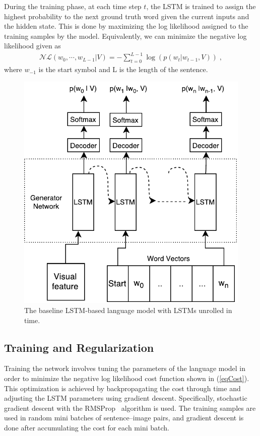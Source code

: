 During the training phase, at each time step $t$, the LSTM is trained to assign
the highest probability to the next ground truth word given the current inputs
and the hidden state.
This is done by maximizing the log likelihood assigned to the training samples
by the model.
Equivalently, we can minimize the negative log likelihood given as
\begin{align}
  \label{eqCost}
  \mathcal{NL}(w_0,\cdots, w_{L-1} | V) = -\sum_{t=0}^{L-1} \log(p(w_t|w_{t-1},V)) \; ,
\end{align}
\noindent where $w_{-1}$ is the start symbol and L is the length of the sentence.
\begin{figure}[h]
\begin{center}
   \includegraphics[width=0.5\linewidth]{images/Thesis_lstmLangGen.pdf}
\end{center}
\vspace*{-4mm}
\caption{The baseline LSTM-based language model with LSTMs unrolled in time.}
\label{fig:baselinelstmlang}
\end{figure}

\subsection{Training and Regularization}
Training the network involves tuning the parameters of the language model in
order to minimize the negative log likelihood cost function shown in
(\ref{eqCost}).
This optimization is achieved by backpropagating the cost through time and
adjusting the LSTM parameters using gradient descent.
Specifically, stochastic gradient descent with the RMSProp~\cite{rmspropTielman}
algorithm is used.
The training samples are used in random mini batches of sentence--image pairs,
and gradient descent is done after accumulating the cost for each mini batch.

